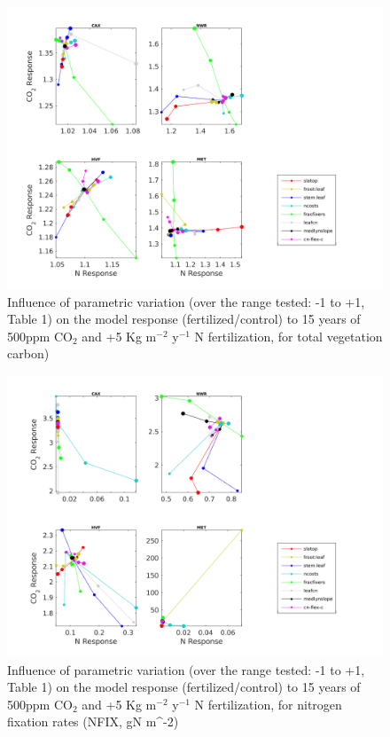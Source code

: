 \documentclass[draft,linenumbers]{agujournal}
\begin{document}
  
    \begin{figure}[h]
     \includegraphics[width=1.2\textwidth]{matlab/figures/MAY19jp_at_relCNdep_defpft_TOTVEGC_y2013.png}
     \caption{Influence of parametric variation (over the range tested: -1 to +1, Table 1) on the model response (fertilized/control) to 15 years of 500ppm CO$_{2}$ and +5 Kg m$^{-2}$ y$^{-1}$ N fertilization, for total vegetation carbon)}
     \label{CN_TOTVEGC}
  \end{figure}
  
\begin{figure}[h]
     \includegraphics[width=1.2\textwidth]{matlab/figures/MAY19jp_at_relCNdep_defpft_NFIX_y2013.png}
     \caption{Influence of parametric variation (over the range tested: -1 to +1, Table 1) on the model response (fertilized/control) to 15 years of 500ppm CO$_{2}$ and +5 Kg m$^{-2}$ y$^{-1}$ N fertilization, for nitrogen fixation rates (NFIX, gN m^{-2})}
     \label{CN_NFIX}
  \end{figure}
  
\end{document}
